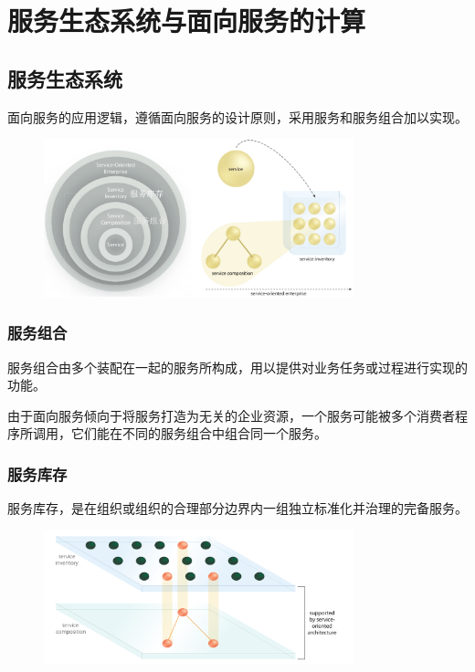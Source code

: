 \section{服务生态系统与面向服务的计算}

\subsection{服务生态系统}

面向服务的应用逻辑，遵循面向服务的设计原则，采用服务和服务组合加以实现。

\begin{figure}[H]
    \vspace{-0.5em}
	\centering
	\includegraphics[width=0.8\textwidth]{images/面向服务的应用逻辑.png}
    \vspace{-1em}
\end{figure}

\subsubsection{服务组合}
服务组合由多个装配在一起的服务所构成，用以提供对业务任务或过程进行实现的功能。

由于面向服务倾向于将服务打造为无关的企业资源，一个服务可能被多个消费者程序所调用，它们能在不同的服务组合中组合同一个服务。


\subsubsection{服务库存}
服务库存，是在组织或组织的合理部分边界内一组独立标准化并治理的完备服务。

\begin{figure}[H]
    \vspace{-0.5em}
	\centering
	\includegraphics[width=0.8\textwidth]{images/服务库存与服务组合.png}
    \vspace{-1em}
\end{figure}

